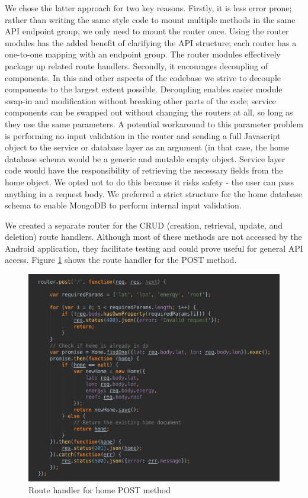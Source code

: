 \documentclass[pageno]{jpaper}
\begin{document}
We chose the latter approach for two key reasons. Firstly, it is less error prone; rather than writing the same style code to mount multiple methods in the same API endpoint group, we only need to mount the router once. Using the router modules has the added benefit of clarifying the API structure; each router has a one-to-one mapping with an endpoint group. The router modules effectively package up related route handlers. Secondly, it encourages decoupling of components. In this and other aspects of the codebase we strive to decouple components to the largest extent possible. Decoupling enables easier module swap-in and modification without breaking other parts of the code; service components can be swapped out without changing the routers at all, so long as they use the same parameters. A potential workaround to this parameter problem is performing no input validation in the router and sending a full Javascript object to the service or database layer as an argument (in that case, the home database schema would be a generic and mutable empty object. Service layer code would have the responsibility of retrieving the necessary fields from the home object. We opted not to do this because it risks safety - the user can pass anything in a request body. We preferred a strict structure for the home database schema to enable MongoDB to perform internal input validation.

We created a separate router for the CRUD  (creation, retrieval, update, and deletion) route handlers. Although most of these methods are not accessed by the Android application, they facilitate testing and could prove useful for general API access. Figure \ref{fig:postrouter} shows the route handler for the POST method.

\begin{figure}[h]
\begin{center}
\includegraphics[scale=0.6] {postrouter}
\caption{Route handler for home POST method}
\label{fig:postrouter}
\end{center}
\end{figure}
\end{document}
